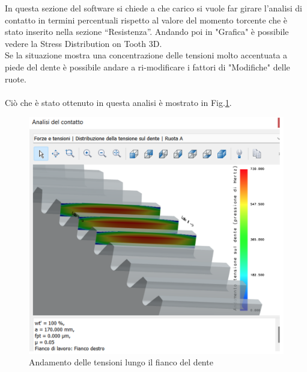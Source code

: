 In questa sezione del software si chiede a che carico si vuole far girare l’analisi di contatto in termini percentuali rispetto al valore del momento torcente che è stato inserito nella sezione “Resistenza”. Andando poi in "Grafica" è possibile vedere la Stress Distribution on Tooth 3D. \\
Se la situazione mostra una concentrazione delle tensioni molto accentuata a piede del dente è possibile andare a ri-modificare i fattori di "Modifiche" delle ruote.\\
\\
Ciò che è stato ottenuto in questa analisi è mostrato in Fig.\ref{fig:StressDistributionCoppia67}.
\begin{figure}[h]
    \centering
    \includegraphics[scale=0.4]{Immagini/StressDistributionCoppia67.png}
    \caption{Andamento delle tensioni lungo il fianco del dente}
    \label{fig:StressDistributionCoppia67}
\end{figure}

